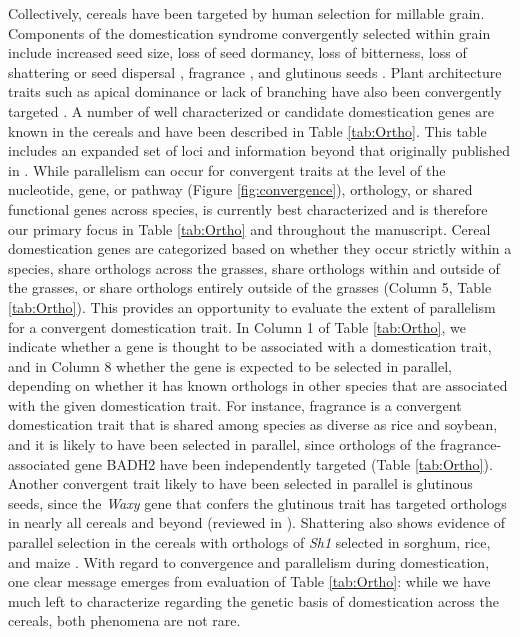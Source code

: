 \documentclass[12pt]{article}
\begin{document}
Collectively, cereals have been targeted by human selection for millable grain.
Components of the domestication syndrome convergently selected within grain include increased seed size, loss of seed dormancy, loss of bitterness, loss of shattering or seed dispersal \citep{Lenser2013}, fragrance \citep{Kellogg2001}, and glutinous seeds \citep{Meyer2013}.
Plant architecture traits such as apical dominance or lack of branching have also been convergently targeted \citep{Lenser2013}.
A number of well characterized or candidate domestication genes are known in the cereals and have been described in Table \ref{tab:Ortho}.
This table includes an expanded set of loci and information beyond that originally published in \citep{Lenser2013}. 
While parallelism can occur for convergent traits at the level of the nucleotide, gene, or pathway  (Figure \ref{fig:convergence}), orthology, or shared functional genes across species, is currently best characterized and is therefore our primary focus in Table \ref{tab:Ortho} and throughout the manuscript.
Cereal domestication genes are categorized based on whether they occur strictly within a species, share orthologs across the grasses, share orthologs within and outside of the grasses, or share orthologs entirely outside of the grasses (Column 5, Table \ref{tab:Ortho}). 
This provides an opportunity to evaluate the extent of parallelism for a convergent domestication trait. 
In Column 1 of Table \ref{tab:Ortho}, we indicate whether a gene is thought to be associated with a domestication trait, and in Column 8 whether the gene is expected to be selected in parallel, depending on whether it has known orthologs in other species that are associated with the given domestication trait. 
For instance, fragrance is a convergent domestication trait that is shared among species as diverse as rice and soybean, and it is likely to have been selected in parallel, since orthologs of the fragrance-associated gene BADH2 have been independently targeted (Table \ref{tab:Ortho}).  
Another convergent trait likely to have been selected in parallel is glutinous seeds, since the \emph{Waxy} gene that confers the glutinous trait has targeted orthologs in nearly all cereals and beyond (reviewed in \citep{Meyer2013}).
Shattering also shows evidence of parallel selection in the cereals with orthologs of \emph{Sh1} selected in sorghum, rice, and maize \citep{Lin2012}.
With regard to convergence and parallelism during domestication, one clear message emerges from evaluation of Table \ref{tab:Ortho}: while we have much left to characterize regarding the genetic basis of domestication across the cereals, both phenomena are not rare.
\end{document}
